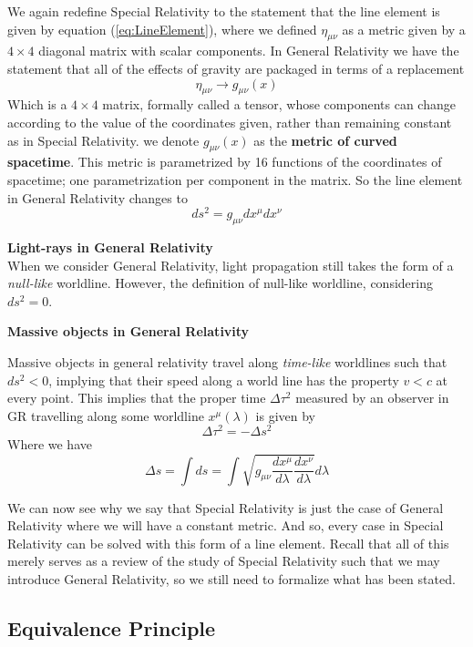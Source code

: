 \documentclass{article}
\begin{document}
 		We again redefine Special Relativity to the statement that the line element is given by equation (\ref{eq:LineElement}), where we defined $\eta_{\mu\nu}$ as a metric given by a $4\times4$ diagonal matrix with scalar components. In General Relativity we have the statement that all of the effects of gravity are packaged in terms of a replacement 
 		$$ \eta_{\mu\nu} \to g_{\mu \nu} (x)$$
 		Which is a $4\times4$ matrix, formally called a tensor, whose components can change according to the value of the coordinates given, rather than remaining constant as in Special Relativity. we denote $g_{\mu \nu}(x)$ as the \textbf{metric of curved spacetime}. This metric is parametrized by 16 functions of the coordinates of spacetime; one parametrization per component in the matrix. So the line element in General Relativity changes to
 		$$ ds^2 = g_{\mu\nu} dx^\mu dx^\nu$$
 		\begin{exmp}
 			\textbf{Light-rays in General Relativity}\\
 			
 			When we consider General Relativity, light propagation still takes the form of a \textit{null-like} worldline. However, the definition of null-like worldline, considering $ds^2 = 0$.
 		\end{exmp}
 		\begin{exmp}
 			\textbf{Massive objects in General Relativity}
 			
 			Massive objects in general relativity travel along \textit{time-like} worldlines such that $ds^2 < 0$, implying that their speed along a world line has the property $v<c$ at every point. This implies that the proper time $\Delta \tau^2$ measured by an observer in GR travelling along some worldline $x^\mu (\lambda)$ is given by
 			$$ \Delta \tau^2 = - \Delta s^2$$
 			Where we have
 			$$ \Delta s = \int ds = \int \sqrt{g_{\mu\nu} \frac{dx^\mu}{d\lambda} \frac{dx^\nu}{d\lambda}}d\lambda$$
 		
 		\end{exmp}
 	\pagebreak
 		We can now see why we say that Special Relativity is just the case of General Relativity where we will have a constant metric. And so, every case in Special Relativity can be solved with this form of a line element. Recall that all of this merely serves as a review of the study of Special Relativity such that we may introduce General Relativity, so we still need to formalize what has been stated.
 		
 		\subsection{Equivalence Principle}\par
 		
\end{document}

